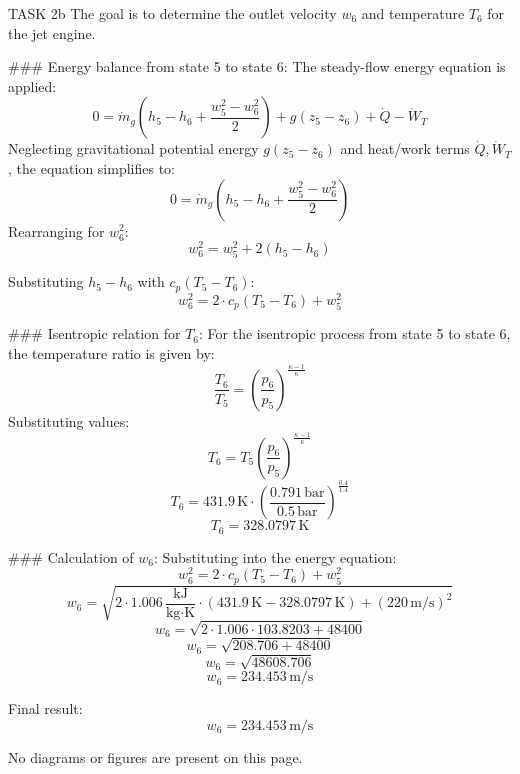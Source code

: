 TASK 2b  
The goal is to determine the outlet velocity \( w_6 \) and temperature \( T_6 \) for the jet engine.  

### Energy balance from state 5 to state 6:  
The steady-flow energy equation is applied:  
\[
0 = \dot{m}_g \left( h_5 - h_6 + \frac{w_5^2 - w_6^2}{2} \right) + g(z_5 - z_6) + \dot{Q} - \dot{W}_T
\]  
Neglecting gravitational potential energy \( g(z_5 - z_6) \) and heat/work terms \( \dot{Q}, \dot{W}_T \), the equation simplifies to:  
\[
0 = \dot{m}_g \left( h_5 - h_6 + \frac{w_5^2 - w_6^2}{2} \right)
\]  
Rearranging for \( w_6^2 \):  
\[
w_6^2 = w_5^2 + 2(h_5 - h_6)
\]  

Substituting \( h_5 - h_6 \) with \( c_p(T_5 - T_6) \):  
\[
w_6^2 = 2 \cdot c_p(T_5 - T_6) + w_5^2
\]  

### Isentropic relation for \( T_6 \):  
For the isentropic process from state 5 to state 6, the temperature ratio is given by:  
\[
\frac{T_6}{T_5} = \left( \frac{p_6}{p_5} \right)^{\frac{\kappa - 1}{\kappa}}
\]  
Substituting values:  
\[
T_6 = T_5 \left( \frac{p_6}{p_5} \right)^{\frac{\kappa - 1}{\kappa}}
\]  
\[
T_6 = 431.9 \, \text{K} \cdot \left( \frac{0.791 \, \text{bar}}{0.5 \, \text{bar}} \right)^{\frac{0.4}{1.4}}
\]  
\[
T_6 = 328.0797 \, \text{K}
\]  

### Calculation of \( w_6 \):  
Substituting into the energy equation:  
\[
w_6^2 = 2 \cdot c_p(T_5 - T_6) + w_5^2
\]  
\[
w_6 = \sqrt{2 \cdot 1.006 \, \frac{\text{kJ}}{\text{kg·K}} \cdot (431.9 \, \text{K} - 328.0797 \, \text{K}) + (220 \, \text{m/s})^2}
\]  
\[
w_6 = \sqrt{2 \cdot 1.006 \cdot 103.8203 + 48400}
\]  
\[
w_6 = \sqrt{208.706 + 48400}
\]  
\[
w_6 = \sqrt{48608.706}
\]  
\[
w_6 = 234.453 \, \text{m/s}
\]  

Final result:  
\[
w_6 = 234.453 \, \text{m/s}
\]  

No diagrams or figures are present on this page.